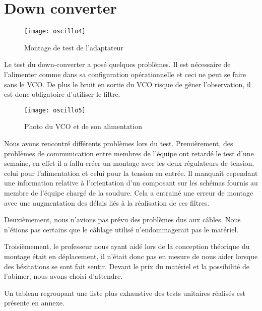 \section{Down converter}
\label{sec:down_converter}



\begin{figure}[h]
  \centering
  \texttt{[image: oscillo4]}
  \caption{Montage de test de l’adaptateur}
  \label{fig:mont}
\end{figure}


Le test du down-converter a posé quelques problèmes. Il est nécessaire de l’alimenter comme dans sa configuration opérationnelle et ceci ne peut se faire sans le VCO. De plus le bruit en sortie du VCO risque de gêner l’observation, il est donc obligatoire d'utiliser le filtre.


\begin{figure}[h]
  \centering
  \texttt{[image: oscillo5]}
  \caption{Photo du VCO et de son alimentation}
  \label{fig:photo}
\end{figure}



Nous avons rencontré différents  problèmes lors du test. Premièrement, des problèmes de communication entre membres de l’équipe ont retardé le test d’une semaine, en effet il a fallu créer un montage avec les deux régulateurs de tension, celui pour l’alimentation et celui pour la tension en entrée. Il manquait cependant une information relative à l'orientation d'un composant sur les schémas fournis au membre de l'équipe chargé de la soudure. Cela a entrainé une erreur de montage avec une augmentation des délais liés à la réalisation de ces filtres.

Deuxièmement, nous n’avions pas prévu des problèmes dus aux câbles. Nous n'étions pas certains que le câblage utilisé n'endommagerait pas le matériel.

Troisièmement, le professeur nous ayant aidé lors de la conception théorique du montage était en déplacement, il n’était donc pas en mesure de nous aider lorsque des hésitations se sont fait sentir. Devant le prix du matériel et la possibilité de l'abimer, nous avons choisi d'attendre.

Un tableau regroupant une liste plus exhaustive des tests unitaires réalisés est présente en annexe.


